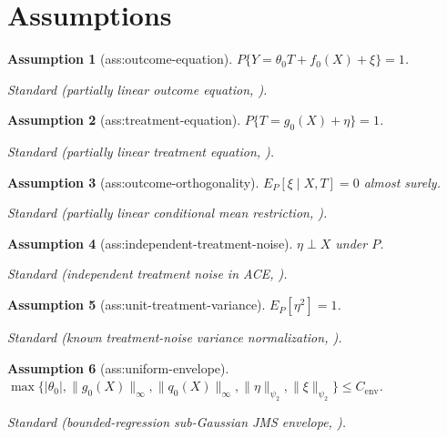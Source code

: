 \documentclass{article}
\newtheorem{assumption}{Assumption}
\begin{document}
\section{Assumptions}

\begin{assumption}[ass:outcome-equation]\label{ass:outcome-equation}
\(P\{Y=\theta_0T+f_0(X)+\xi\}=1\).
\par\smallskip\noindent\emph{Standard} (partially linear outcome equation, \cite{Robinson1988PLM}).
\end{assumption}

\begin{assumption}[ass:treatment-equation]\label{ass:treatment-equation}
\(P\{T=g_0(X)+\eta\}=1\).
\par\smallskip\noindent\emph{Standard} (partially linear treatment equation, \cite{Robinson1988PLM}).
\end{assumption}

\begin{assumption}[ass:outcome-orthogonality]\label{ass:outcome-orthogonality}
\(E_P[\xi\mid X,T]=0\) almost surely.
\par\smallskip\noindent\emph{Standard} (partially linear conditional mean restriction, \cite{Robinson1988PLM}).
\end{assumption}

\begin{assumption}[ass:independent-treatment-noise]\label{ass:independent-treatment-noise}
\(\eta\perp X\) under \(P\).
\par\smallskip\noindent\emph{Standard} (independent treatment noise in ACE, \cite{JinMackeySyrgkanis2025HardNormal}).
\end{assumption}

\begin{assumption}[ass:unit-treatment-variance]\label{ass:unit-treatment-variance}
\(E_P[\eta^2]=1\).
\par\smallskip\noindent\emph{Standard} (known treatment-noise variance normalization, \cite{JinMackeySyrgkanis2025HardNormal}).
\end{assumption}

\begin{assumption}[ass:uniform-envelope]\label{ass:uniform-envelope}
\(\max\{|\theta_0|,\|g_0(X)\|_\infty,\|q_0(X)\|_\infty,\|\eta\|_{\psi_2},\|\xi\|_{\psi_2}\}\le C_{\mathrm{env}}\).
\par\smallskip\noindent\emph{Standard} (bounded-regression sub-Gaussian JMS envelope, \cite{JinMackeySyrgkanis2025HardNormal}).
\end{assumption}
\end{document}
